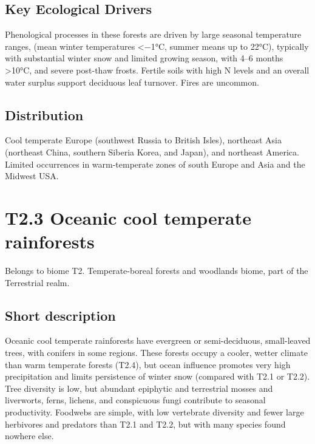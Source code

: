 \documentclass[
  letterpaper,
  DIV=11,
  numbers=noendperiod]{scrartcl}
\begin{document}
\subsection{Key Ecological Drivers}\label{key-ecological-drivers-74}

Phenological processes in these forests are driven by large seasonal
temperature ranges, (mean winter temperatures \textless−1°C, summer
means up to 22°C), typically with substantial winter snow and limited
growing season, with 4--6 months \textgreater10°C, and severe post-thaw
frosts. Fertile soils with high N levels and an overall water surplus
support deciduous leaf turnover. Fires are uncommon.

\subsection{Distribution}\label{distribution-74}

Cool temperate Europe (southwest Russia to British Isles), northeast
Asia (northeast China, southern Siberia Korea, and Japan), and northeast
America. Limited occurrences in warm-temperate zones of south Europe and
Asia and the Midwest USA.

\section{T2.3 Oceanic cool temperate
rainforests}\label{t2.3-oceanic-cool-temperate-rainforests}

Belongs to biome T2. Temperate-boreal forests and woodlands biome, part
of the Terrestrial realm.

\subsection{Short description}\label{short-description-75}

Oceanic cool temperate rainforests have evergreen or semi-deciduous,
small-leaved trees, with conifers in some regions. These forests occupy
a cooler, wetter climate than warm temperate forests (T2.4), but ocean
influence promotes very high precipitation and limits persistence of
winter snow (compared with T2.1 or T2.2). Tree diversity is low, but
abundant epiphytic and terrestrial mosses and liverworts, ferns,
lichens, and conspicuous fungi contribute to seasonal productivity.
Foodwebs are simple, with low vertebrate diversity and fewer large
herbivores and predators than T2.1 and T2.2, but with many species found
nowhere else.
\end{document}
